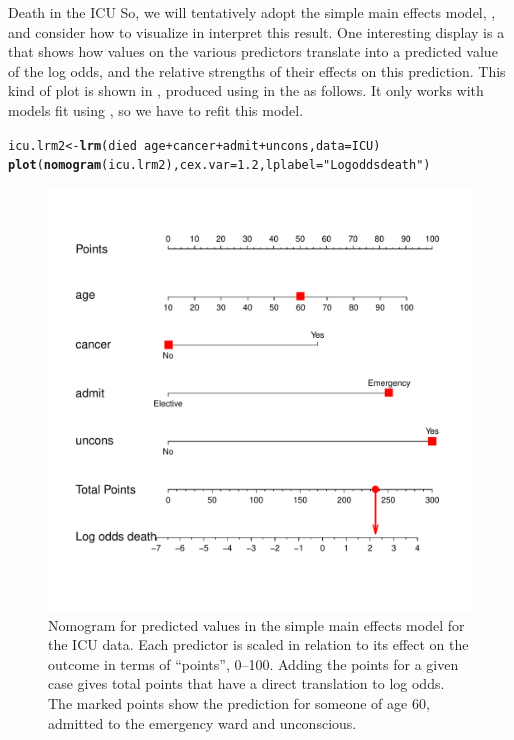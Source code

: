 \documentclass[11pt]{book}\usepackage[]{graphicx}\usepackage[]{color}
\makeatletter
\newcommand{\hlnum}[1]{\textcolor[rgb]{0.686,0.059,0.569}{#1}}%
\newcommand{\hlstr}[1]{\textcolor[rgb]{0.192,0.494,0.8}{#1}}%
\newcommand{\hlopt}[1]{\textcolor[rgb]{0,0,0}{#1}}%
\newcommand{\hlstd}[1]{\textcolor[rgb]{0.345,0.345,0.345}{#1}}%
\newcommand{\hlkwb}[1]{\textcolor[rgb]{0.69,0.353,0.396}{#1}}%
\newcommand{\hlkwc}[1]{\textcolor[rgb]{0.333,0.667,0.333}{#1}}%
\newcommand{\hlkwd}[1]{\textcolor[rgb]{0.737,0.353,0.396}{\textbf{#1}}}%
\newenvironment{kframe}{%
 \def\at@end@of@kframe{}%
 \ifinner\ifhmode%
  \def\at@end@of@kframe{\end{minipage}}%
  \begin{minipage}{\columnwidth}%
 \fi\fi%
 \def\FrameCommand##1{\hskip\@totalleftmargin \hskip-\fboxsep
 \colorbox{shadecolor}{##1}\hskip-\fboxsep
     \hskip-\linewidth \hskip-\@totalleftmargin \hskip\columnwidth}%
 \MakeFramed {\advance\hsize-\width
   \@totalleftmargin\z@ \linewidth\hsize
   \@setminipage}}%
 {\par\unskip\endMakeFramed%
 \at@end@of@kframe}
\newenvironment{knitrout}{}{} %
\renewenvironment{knitrout}{\small\renewcommand{\baselinestretch}{.85}}{} %
\makeatother
\begin{document}
\begin{Example}[icu1]{Death in the ICU}
So, we will tentatively adopt the simple main effects model, ,
and consider how to visualize in interpret this result.
One interesting display is a  that shows how values on the various
predictors translate into a predicted value of the log odds, and the relative
strengths of their effects on this prediction.  This kind of plot is shown in
, produced using  in the 
as follows.  It only works with models fit using , so we have to
refit this model.

\begin{knitrout}
\color{fgcolor}\begin{kframe}
\begin{alltt}
\hlstd{icu.lrm2} \hlkwb{<-} \hlkwd{lrm}\hlstd{(died} \hlopt{~} \hlstd{age} \hlopt{+} \hlstd{cancer}  \hlopt{+} \hlstd{admit} \hlopt{+} \hlstd{uncons,} \hlkwc{data}\hlstd{=ICU)}
\hlkwd{plot}\hlstd{(}\hlkwd{nomogram}\hlstd{(icu.lrm2),} \hlkwc{cex.var}\hlstd{=}\hlnum{1.2}\hlstd{,} \hlkwc{lplabel}\hlstd{=}\hlstr{"Log odds death"}\hlstd{)}
\end{alltt}
\end{kframe}
\end{knitrout}


\begin{figure}[!htb]
 \centering
 \includegraphics[width=.7\textwidth]{ch07/fig/icu-nomogram}
 \caption{Nomogram for predicted values in the simple main effects model for the ICU data.  Each predictor is scaled in relation to its effect on the outcome in terms of ``points'', 0--100.  Adding the points for a given case gives total points that have a direct translation to log odds.  The marked points show the prediction for someone of age 60, admitted to the emergency ward and unconscious. }
 \label{fig:icu-nomogram}
\end{figure}


\end{Example}
\end{document}
